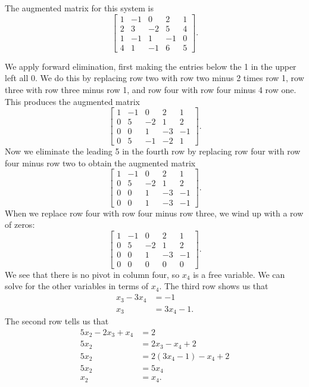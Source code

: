 \begin{example}
\ExampleSolution
\ba
\item The augmented matrix for this system is 
\[\left[ \begin{array}{crrr|c} 1&-1&0&2&1 \\ 2&3&-2&5&4 \\ 1&-1&1&-1&0 \\ 4&1&-1&6&5 \end{array} \right].\]
\item We apply forward elimination, first making the entries below the 1 in the upper left all 0. We do this by replacing row two with row two minus 2 times row 1, row three with row three minus row 1, and row four with row four minus 4 row one. This produces the augmented matrix
 \[\left[ \begin{array}{crrr|r} 1&-1&0&2&1 \\ 0&5&-2&1&2 \\ 0&0&1&-3&-1 \\ 0&5&-1&-2&1 \end{array} \right].\]
 Now we eliminate the leading 5 in the fourth row by replacing row four with row four minus row two to obtain the augmented matrix
  \[\left[ \begin{array}{crrr|r} 1&-1&0&2&1 \\ 0&5&-2&1&2 \\ 0&0&1&-3&-1 \\ 0&0&1&-3&-1 \end{array} \right].\]
  When we replace row four with row four minus row three, we wind up with a row of zeros:
  \[\left[ \begin{array}{crrr|r} 1&-1&0&2&1 \\ 0&5&-2&1&2 \\ 0&0&1&-3&-1 \\ 0&0&0&0&0 \end{array} \right].\]  
 We see that there is no pivot in column four, so $x_4$ is a free variable. We can solve for the other variables in terms of $x_4$. The third row shows us that 
 \begin{align*}
 x_3 - 3x_4 &= -1 \\
 x_3 &= 3x_4 - 1.
 \end{align*}
 The second row tells us that
 \begin{align*}
 5x_2 - 2x_3 + x_4 &= 2 \\
 5x_2 &= 2x_3 - x_4 + 2 \\
 5x_2 &= 2(3x_4-1) - x_4 + 2 \\
 5x_2 &= 5x_4 \\
 x_2 &= x_4.

\end{align*}
\end{example}
